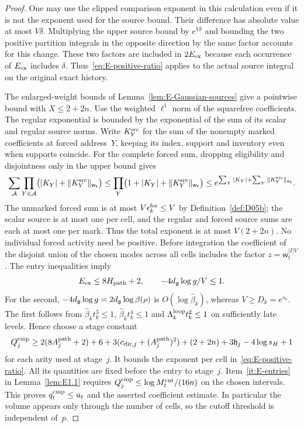 \begin{proof}
One may use the clipped comparison exponent in this calculation even if it is not the exponent used for the source bound. Their difference has absolute value at most $V\delta$. Multiplying the upper source bound by $e^{V\delta}$ and bounding the two positive partition integrals in the opposite direction by the same factor accounts for this change. These two factors are included in $2E_{\rm ex}$ because each occurrence of $E_{\rm ex}$ includes $\delta$. Thus~\eqref{eq:E-positive-ratio} applies to the actual source integral on the original exact history.

The enlarged-weight bounds of Lemma~\ref{lem:E-Gaussian-sources} give a pointwise bound with $X\le2+2n$. Use the weighted $\ell^1$ norm of the squarefree coefficients. The regular exponential is bounded by the exponential of the sum of its scalar and regular source norms. Write $K_Y^{\rm src}$ for the sum of the nonempty marked coefficients at forced address~$Y$, keeping its index, support and inventory even when supports coincide. For the complete forced sum, dropping eligibility and disjointness only in the upper bound gives
\[
 \sum_{\mathcal A}\prod_{Y\in\mathcal A}
 \bigl(|K_Y|+\|K_Y^{\rm src}\|_{\mathsf w_t}\bigr)
 \le\prod_Y\bigl(1+|K_Y|+\|K_Y^{\rm src}\|_{\mathsf w_t}\bigr)
 \le e^{\sum_Y|K_Y|+\sum_Y\|K_Y^{\rm src}\|_{\mathsf w_t}}.
\]
The unmarked forced sum is at most $V\epsilon_k^{\rm for}\le V$ by Definition~\ref{def:D05b}; the scalar source is at most one per cell, and the regular and forced source sums are each at most one per mark. Thus the total exponent is at most $V(2+2n)$. No individual forced activity need be positive. Before integration the coefficient of the disjoint union of the chosen modes across all cells includes the factor $z=\mathsf w_t^{|I|V}$. The entry inequalities imply
\begin{equation*}
 E_{\rm ex}\le8H_{\rm path}+2,\qquad
 -4d_{\mathfrak{g}}\log g/V\le1.
\end{equation*}
For the second, $-4d_{\mathfrak{g}}\log g=2d_{\mathfrak{g}}\log\beta(\rho)$ is $O(\log\widehat\beta_k)$, whereas $V\ge D_k=e^{s_k}$. The first follows from
$\widehat\beta_kt_k^3\le1$, $\widehat\beta_kt_k^4\le1$ and $\Lambda_k^{\rm loop}t_k^2\le1$ on sufficiently late levels. Hence choose a stage constant
\begin{equation}\label{eq:E-comparison-cost}
 Q_j^{\rm cmp}\ge2(8A_j^{\rm path}+2)+6+3(c_{{\rm dir},j}+(A_j^{\rm path})^2)+(2+2n)
 +3\mathfrak h_j-4\log s_H+1
\end{equation}
for each arity used at stage~$j$. It bounds the exponent per cell in~\eqref{eq:E-positive-ratio}. All its quantities are fixed before the entry to stage~$j$. Item~\ref{it:E-entries} in Lemma~\ref{lem:E1.1} requires $Q_j^{\rm cmp}\le\log M^{\mathrm{cut}}_t/(16n)$ on the chosen intervals. This proves $q_t^{\rm cmp}\le u_t$ and the asserted coefficient estimate. In particular the volume appears only through the number of cells, so the cutoff threshold is independent of~$p$.
\end{proof}
